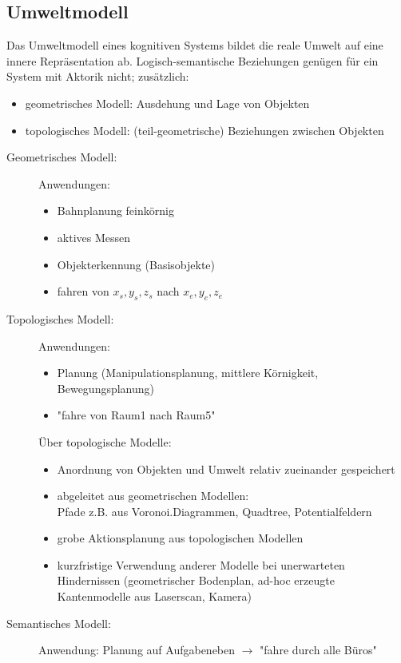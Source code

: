 \subsection{Umweltmodell}

Das Umweltmodell eines kognitiven Systems bildet die reale Umwelt auf eine innere Repräsentation ab. Logisch-semantische Beziehungen genügen für ein System mit Aktorik nicht; zusätzlich:
\begin{itemize}
\item geometrisches Modell: Ausdehung und Lage von Objekten
\item topologisches Modell: (teil-geometrische) Beziehungen zwischen Objekten
\end{itemize}


\begin{description}
\item[Geometrisches Modell:] Anwendungen:
\begin{itemize}
\item Bahnplanung feinkörnig
\item aktives Messen
\item Objekterkennung (Basisobjekte)
\item fahren von $x_s,y_s,z_s$ nach $x_e,y_e,z_e$
\end{itemize}
\item[Topologisches Modell:] Anwendungen:
\begin{itemize}
\item Planung (Manipulationsplanung, mittlere Körnigkeit, Bewegungsplanung)
\item "{}fahre von Raum1 nach Raum5"{}
\end{itemize}
Über topologische Modelle:
\begin{itemize}
\item Anordnung von Objekten und Umwelt relativ zueinander gespeichert
\item abgeleitet aus geometrischen Modellen: \\ Pfade z.B. aus Voronoi.Diagrammen, Quadtree, Potentialfeldern
\item grobe Aktionsplanung aus topologischen Modellen
\item kurzfristige Verwendung anderer Modelle bei unerwarteten Hindernissen (geometrischer Bodenplan, ad-hoc erzeugte Kantenmodelle aus Laserscan, Kamera)
\end{itemize}
\item[Semantisches Modell:] Anwendung: Planung auf Aufgabeneben $\to$ "{}fahre durch alle Büros"{} \\

\end{description}
